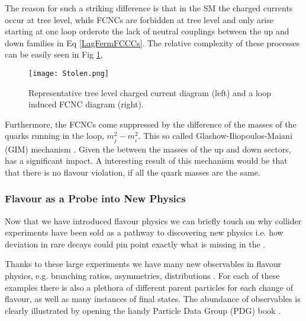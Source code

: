 The reason for such a striking difference is that in the SM the charged currents occur at tree level, while FCNCs are forbidden at tree level and only arise starting at one loop orderote the lack of neutral couplings between the up and down families in Eq \ref{LagFermFCCCs}. The relative complexity of these processes can be easily seen in Fig \ref{fig:Flavour_D_1},
%
\begin{figure}[H]
	\centering
	\texttt{[image: Stolen.png]}
	\caption{Representative tree level charged current diagram (left) and a loop induced FCNC diagram (right).}
	\label{fig:Flavour_D_1}
\end{figure}
%
%
Furthermore, the FCNCs come suppressed by the difference of the masses of the quarks running in the loop, $m^2_j-m^2_i$. This so called Glashow-Iliopoulos-Maiani (GIM) mechanism \cite{glashow1970weak}. Given the  between the masses of the up and down sectors,  has a significant impact. 
%
A interesting result of this mechanism would be that that there is no flavour violation, if all the quark masses are the same.

\subsubsection{Flavour as a Probe into New Physics}

Now that we have introduced  flavour physics we can briefly touch on why collider experiments have been sold  as a pathway to discovering new physics i.e. how deviation in rare decays could pin point exactly what is missing in the . 

Thanks to these large experiments we have many new observables in flavour physics, e.g.  branching ratios, asymmetries, distributions . For each of these examples there is also a plethora of different parent particles for each change of flavour, as well as many instances of final states. 
%
The abundance of observables is clearly illustrated by opening the handy Particle Data Group (PDG) book \cite{Tanabashi:2018oca}.


